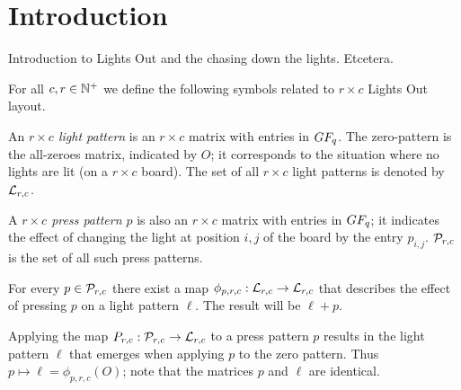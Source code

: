\section{Introduction}

Introduction to Lights Out and the chasing down the lights. Etcetera.

\begin{definition}
  For all $c,r\in\mathbb{N}^{+}$ we define the following symbols related to
  $r \times c$ Lights Out layout.
  
  An {\it $r\times c$ light pattern} is an $r\times c$ matrix
  with entries in $GF_q$. The zero-pattern is the all-zeroes
  matrix, indicated by $O$; it corresponds to the situation
  where no lights are lit (on a $r\times c$ board).
  The set of all $r\times c$ light patterns is denoted by $\mathcal{L}_{r,c}$.

  A {\it $r\times c$ press pattern $p$} is also an $r\times c$ matrix
  with entries in $GF_q$; it indicates the effect of changing
  the light at position $i, j$ of the board by the entry $p_{i,j}$.
  $\mathcal{P}_{r,c}$ is the set of all such press patterns.

  For every $p\in\mathcal{P}_{r,c}$ there exist a map $\phi_{p,r,c} : \mathcal{L}_{r,c}
  \rightarrow \mathcal{L}_{r,c}$ that describes the effect of pressing $p$ on
  a light pattern $\ell$.  The result will be $\ell + p$.

  Applying the map
  $P_{r,c} : \mathcal{P}_{r,c} \rightarrow \mathcal{L}_{r,c}$
  to a press pattern $p$ results in the light pattern $\ell$ that 
  emerges when applying $p$ to the zero pattern. Thus
  $p \mapsto \ell=\phi_{p,r,c}(O)$; note that the
  matrices $p$ and $\ell$ are identical.
\end{definition}
